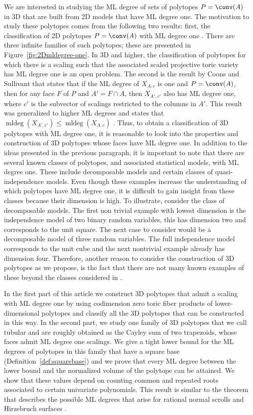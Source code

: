 \documentclass[12pt,reqno]{amsart}   	%
\theoremstyle{plain}
\theoremstyle{definition}
\theoremstyle{remark}
\newcommand{\mldeg}{\operatorname{mldeg}}
\begin{document}
We are interested in studying the ML degree of sets of polytopes $P=\conv(A)$ in 3D that are built from 2D
models that have ML degree one. The motivation to study these polytopes comes from the following two results: first, the classification of 2D polytopes $P=\conv(A)$ with ML degree one \cite{davies2023,vonBothmer2010,garciapuente2010}. There are three infinite families of such polytopes; these are presented in Figure~\ref{fig:2Dmldegree-one}. In 3D and higher, the classification of polytopes for which there is a scaling such that the associated scaled projective toric variety has ML degree one is an open problem. 
The second is the result by Coons and Sullivant \cite{coons2021} that states that if the ML degree of $X_{A,c}$ is one and $P=\conv(A)$, then for any face $F$ of $P$ and $A' = F \cap A$, then $X_{A',c'}$ also has ML degree one, where $c'$ is the subvector of scalings restricted to the columns in $A'$. This result was generalized to higher ML degrees and states that $\mldeg(X_{A',c'})\leq \mldeg(X_{A,c})$ \cite{amendola2025}. Thus, to obtain a classification of 3D polytopes with ML degree one, it is reasonable to look into the properties and construction of 3D polytopes whose faces have ML degree one.
In addition to the ideas presented in the previous paragraph, it is important to note
that there are several 
known classes of polytopes, and associated statistical models, with ML degree one. These include decomposable models and certain classes of quasi-independence models. Even though these examples increase the understanding of which polytopes have ML degree one, it is difficult to gain insight from these classes because their dimension is high. To illustrate, consider the class of decomposable models. The first non trivial example with lowest dimension is the independence model of two binary random variables, this has dimension two and
corresponds
to the unit square. The next case to consider would be a decomposable model of three random variables. The full independence model corresponds to the unit cube and the next nontrivial example already has dimension four. Therefore, another reason to consider the construction
of 3D polytopes as we propose, is the fact that there are not many known examples of these beyond the classes considered in \cite[Section 3]{davies2023}.

In the first part of this article we construct 3D polytopes that admit a scaling with ML degree one by using codimension zero toric fiber products of 
lower-dimensional polytopes and classify all the 3D polytopes that can be constructed in this way.
In the second part, we study one family of 3D polytopes that we call tubular and are roughly obtained as the Cayley sum of two trapezoids, whose faces admit ML degree one scalings.
We give a tight lower bound for the ML degrees of polytopes in this family that have a square base (Definition~\ref{def:squarebase})  and we  prove that every ML degree between the lower bound and the normalized volume of the polytope can be attained.
We show that these values depend on counting common and repeated roots associated to certain univariate polynomials. This result is similar to the theorem that describes the possible ML degrees that arise for rational normal scrolls \cite{amendola2019} and Hirzebruch surfaces \cite{telen2024}.
\end{document}
